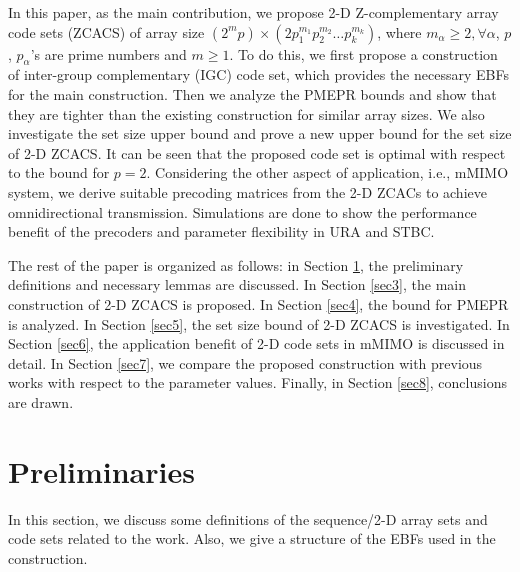 \documentclass[pdflatex,sn-mathphys-num]{sn-jnl}%
\theoremstyle{thmstyleone}
\begin{document}
	In this paper, as the main contribution, we propose 2-D Z-complementary array code sets (ZCACS) of array size $\left( 2^m p \right)  \times \left(  2p_1^{m_1} p_2^{m_2} \dots p_k^{m_k} \right)$, where $m_\alpha \geq 2, \forall \alpha$, $p$, $p_\alpha$'s are prime numbers and $m \geq 1$. To do this, we first propose a construction of inter-group complementary (IGC) code set, which provides the necessary EBFs for the main construction. Then we analyze the PMEPR bounds and show that they are tighter than the existing construction for similar array sizes. We also investigate the set size upper bound and prove a new upper bound for the set size of 2-D ZCACS. It can be seen that the proposed code set is optimal with respect to the bound for $p=2$. Considering the other aspect of application, i.e., mMIMO system, we derive suitable precoding matrices from the 2-D ZCACs to achieve omnidirectional transmission. Simulations are done to show the performance benefit of the precoders and parameter flexibility in URA and STBC.
	
	The rest of the paper is organized as follows: in Section \ref{sec2}, the preliminary definitions and necessary lemmas are discussed. In Section \ref{sec3}, the main construction of 2-D ZCACS is proposed.  In Section \ref{sec4}, the bound for PMEPR is analyzed. In Section \ref{sec5}, the set size bound of 2-D ZCACS is investigated. In Section \ref{sec6}, the application benefit of 2-D code sets in mMIMO is discussed in detail. In Section \ref{sec7}, we compare the proposed construction with previous works with respect to the parameter values. Finally, in Section \ref{sec8}, conclusions are drawn.
	
	\section{Preliminaries}\label{sec2}
	In this section, we discuss some definitions of the sequence/2-D array sets and code sets related to the work. Also, we give a structure of the EBFs used in the construction.
\end{document}
